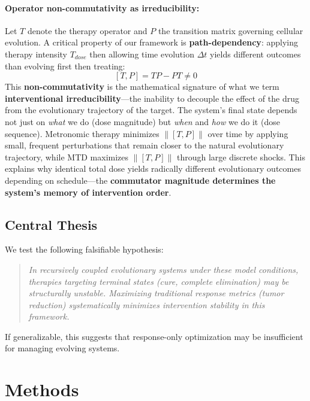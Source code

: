 \documentclass[11pt,a4paper]{article}
\begin{document}
\paragraph{Operator non-commutativity as irreducibility:} Let $T$ denote the therapy operator and $P$ the transition matrix governing cellular evolution. A critical property of our framework is \textbf{path-dependency}: applying therapy intensity $T_{dose}$ then allowing time evolution $\Delta t$ yields different outcomes than evolving first then treating:
\[
[T, P] = TP - PT \neq 0
\]
This \textbf{non-commutativity} is the mathematical signature of what we term \textbf{interventional irreducibility}---the inability to decouple the effect of the drug from the evolutionary trajectory of the target. The system's final state depends not just on \textit{what} we do (dose magnitude) but \textit{when} and \textit{how} we do it (dose sequence). Metronomic therapy minimizes $\|[T,P]\|$ over time by applying small, frequent perturbations that remain closer to the natural evolutionary trajectory, while MTD maximizes $\|[T,P]\|$ through large discrete shocks. This explains why identical total dose yields radically different evolutionary outcomes depending on schedule---the \textbf{commutator magnitude determines the system's memory of intervention order}.

\subsection{Central Thesis}

We test the following falsifiable hypothesis:

\begin{quote}
\textit{In recursively coupled evolutionary systems under these model conditions, therapies targeting terminal states (cure, complete elimination) may be structurally unstable. Maximizing traditional response metrics (tumor reduction) systematically minimizes intervention stability in this framework.}
\end{quote}

If generalizable, this suggests that response-only optimization may be insufficient for managing evolving systems.

\section{Methods}
\end{document}

